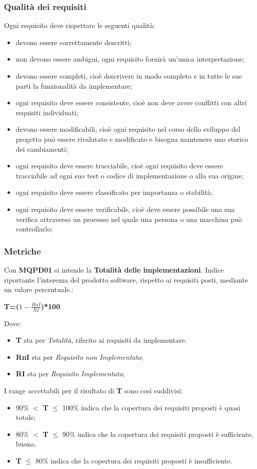 \subsubsection{Qualità dei requisiti}\label{2.2.3.1.7}
Ogni requisito deve rispettare le seguenti qualità:
\begin{itemize}
	\item devono essere correttamente descritti;
	\item non devono essere ambigui, ogni requisito fornirà un'unica interpretazione;
	\item devono essere completi, cioè descrivere in modo completo e in tutte le sue parti la funzionalità da implementare;
	\item ogni requisito deve essere consistente, cioè non deve avere conflitti con altri requisiti individuati;
	\item devono essere modificabili, cioè ogni requisito nel corso dello sviluppo del progetto può essere rivalutato e modificato e bisogna mantenere uno storico dei cambiamenti;
	\item ogni requisito deve essere tracciabile, cioè ogni requisito deve essere tracciabile ad ogni suo test o codice di implementazione o alla sua origine;
	\item ogni requisito deve essere classificato per importanza o stabilità;
	\item ogni requisito deve essere verificabile, cioè deve essere possibile una sua verifica attraverso un processo nel quale una persona o una macchina può controllarlo;
\end{itemize}

\subsubsection{Metriche}\label{2.2.3.1.8}
Con \textbf{MQPD01} si intende la \textbf{Totalità delle implementazioni}. Indice riportante l'interezza del prodotto software, rispetto ai requisiti posti, mediante un valore percentuale.:

\begin{center}
	\textbf{T=($1-\frac{RnI}{RI}$)*100}
\end{center}
Dove:
\begin{itemize}
	\item \textbf{T} sta per \textit{Totalità}, riferito ai requisiti da implementare.
	\item \textbf{RnI} sta per \textit{Requisito non Implementato};
	\item \textbf{RI} sta per \textit{Requisito Implementato};
\end{itemize}
I range accettabili per il risultato di \textbf{T} sono così suddivisi:
\begin{itemize}
	\item 90\% $<$ \textbf{T} $\leq$ 100\% indica che la copertura dei requisiti proposti è quasi totale;
	\item 80\% $<$ \textbf{T} $\leq$ 90\% indica che la copertura dei requisiti proposti è sufficiente, buona.
	\item \textbf{T} $\leq$ 80\% indica che la copertura dei requisiti proposti è insufficiente.
\end{itemize}



